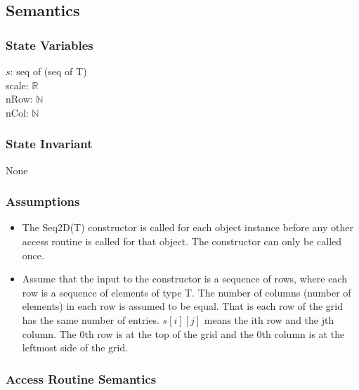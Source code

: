\documentclass[12pt]{article}
\begin{document}
\subsection* {Semantics}

\subsubsection* {State Variables}

$s$: seq of (seq of T)\\
scale: $\mathbb{R}$\\
nRow: $\mathbb{N}$\\
nCol: $\mathbb{N}$

\subsubsection* {State Invariant}

None

\subsubsection* {Assumptions}

\begin{itemize}
\item The Seq2D(T) constructor is called for each object instance before any
other access routine is called for that object.  The constructor can only be
called once.
\item Assume that the input to the constructor is a sequence of rows, where each
  row is a sequence of elements of type T.  The number of columns (number of
  elements) in each row is assumed to be equal. That is each row
  of the grid has the same number of entries.  $s[i][j]$ means the ith row and
  the jth column.  The 0th row is at the top of the grid and the 0th column
  is at the leftmost side of the grid.
\end{itemize}

\subsubsection* {Access Routine Semantics}
\end{document}
